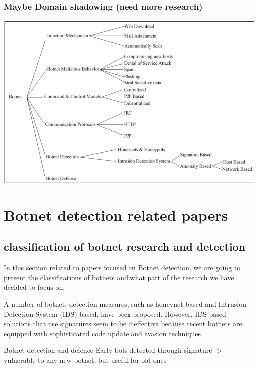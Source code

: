 \subsubsection{Maybe Domain shadowing (need more research)}
\includegraphics[scale=.8]{img/botnet_taxonomy.jpg}


\section{Botnet detection related papers}
\subsection{classification of botnet research and detection}
In this section related to papers focused on Botnet detection, we are going to present the classifications of botnets and what part of the research we have decided to focus on.

A number of botnet, detection measures, such as honeynet-based and Intrusion Detection System (IDS)-based, have been
proposed. However, IDS-based solutions that use signatures seem to be ineffective because recent
botnets are equipped with sophisticated code update and evasion techniques

Botnet detection and defence
Early bots detected through signature 
-> vulnerable to any new botnet, but useful for old ones

